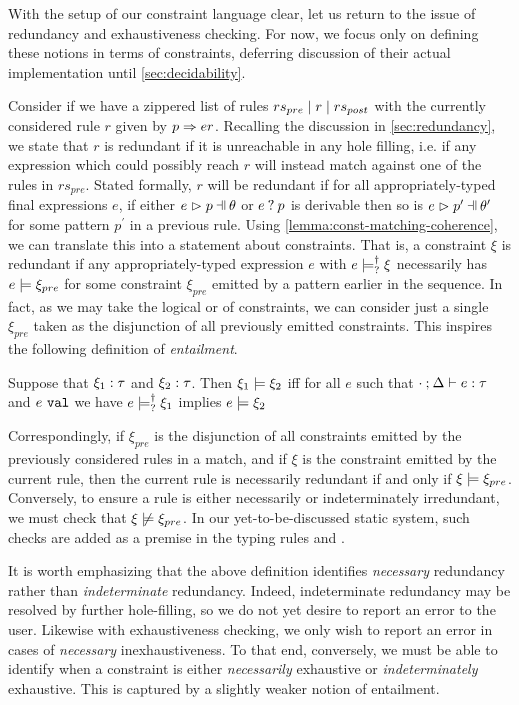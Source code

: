 With the setup of our constraint language clear, let us return to the issue of redundancy and exhaustiveness checking. For now, we focus only on defining these notions in terms of constraints, deferring discussion of their actual implementation until \autoref{sec:decidability}.

Consider if we have a zippered list of rules $rs_{pre} \mid r \mid rs_{post}$ with the currently considered rule $r$ given by $p \Rightarrow er$. Recalling the discussion in \autoref{sec:redundancy}, we state that $r$ is redundant if it is unreachable in any hole filling, i.e. if any expression which could possibly reach $r$ will instead match against one of the rules in $rs_{pre}$. Stated formally, $r$ will be redundant if for all appropriately-typed final expressions $e$, if either $\hpatmatch{e}{p}{\theta}$ or $e \mathbin{?} p$ is derivable then so is $\hpatmatch{e}{p^\prime}{\theta^\prime}$ for some pattern $p^\prime$ in a previous rule. Using \autoref{lemma:const-matching-coherence}, we can translate this into a statement about constraints. That is, a constraint $\xi$ is redundant if any appropriately-typed expression $e$ with $e \models_{?}^{\dag} \xi$ necessarily has $e \models \xi_{pre}$ for some constraint $\xi_{pre}$ emitted by a pattern earlier in the sequence. In fact, as we may take the logical or of constraints, we can consider just a single $\xi_{pre}$ taken as the disjunction of all previously emitted constraints. This inspires the following definition of \emph{entailment}.

\begin{definition}
	\label{definition:const-entailment}
	Suppose that $\xi_1 : \tau$ and $\xi_2 : \tau$.
	Then $\xi_1 \models \xi_2$ iff for all $e$ such that $\cdot \mathbin{;} \Delta \vdash e : \tau$ and $e ~\mathtt{val}$ we have $e \models_{?}^{\dag} \xi_1$ implies $e \models \xi_2$
\end{definition}
Correspondingly, if $\xi_{pre}$ is the disjunction of all constraints emitted by the previously considered rules in a match, and if $\xi$ is the constraint emitted by the current rule, then the current rule is necessarily redundant if and only if $\xi \models \xi_{pre}$. Conversely, to ensure a rule is either necessarily or indeterminately irredundant, we must check that $\cnotsatisfy{\xi}{\xi_{pre}}$. In our yet-to-be-discussed static system, such checks are added as a premise in the typing rules \TOneRules and \TRules.

It is worth emphasizing that the above definition identifies \emph{necessary} redundancy rather than \emph{indeterminate} redundancy. Indeed, indeterminate redundancy may be resolved by further hole-filling, so we do not yet desire to report an error to the user. Likewise with exhaustiveness checking, we only wish to report an error in cases of \emph{necessary} inexhaustiveness. To that end, conversely, we must be able to identify when a constraint is either \emph{necessarily} exhaustive or \emph{indeterminately} exhaustive. This is captured by a slightly weaker notion of entailment.


